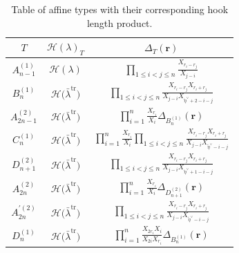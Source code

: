 \documentclass[pdftex]{sigma}
\numberwithin{equation}{section}
\def\cch{\mathcal H}
\begin{document}
\begin{table}[th]\centering\renewcommand{\arraystretch}{1.55}
\caption{Table of affine types with their corresponding hook length product.}\label{tableau2}
	\begin{tabular}{|c|c|c|}
		\hline
		$T$ & $\cch(\lambda)_T$ & $\Delta_T(\mathbf{r})$ \\
		\hline
		\rule{0pt}{17pt} $A^{(1)}_{n-1}$ & $\cch(\lambda)$ &
		$\displaystyle\prod_{1\leq i<j\leq n} \frac{X_{r_i-r_j}}{X_{j-i}}$\\
		\hline
		\rule{0pt}{17pt} $B^{(1)}_{n}$& $\cch\bigl(\bar{\lambda}^{\mathrm{tr}}\bigr)$ &$\displaystyle\prod_{1\leq i<j\leq n} \frac{X_{r_i-r_j}X_{r_i+r_j}}{X_{j-i}X_{\tilde{\eta}^{\vee}+2-i-j}}$ \\
		\hline
		\rule{0pt}{17pt}$A^{(2)}_{2n-1}$ & $\cch\bigl(\bar{\lambda}^{\mathrm{tr}}\bigr)$ &$\displaystyle \prod_{i=1}^{n}\frac{X_{r_i}}{X_i}\Delta_{B_n^{(1)}}(\mathbf{r})$\\
		\hline
		\rule{0pt}{17pt}$C^{(1)}_{n}$& $\cch\bigl(\bar{\lambda}^{\mathrm{tr}}\bigr)$ &$\displaystyle \prod_{i=1}^{n}\frac{X_{r_i}}{X_i}\displaystyle\prod_{1\leq i<j\leq n} \frac{X_{r_i-r_j}X_{r_i+r_j}}{X_{j-i}X_{\tilde{\eta}^{\vee}-i-j}}$\\
		\hline
		\rule{0pt}{17pt}$D^{(2)}_{n+1}$& $\cch\bigl(\bar{\lambda}^{\mathrm{tr}}\bigr)$ &$\displaystyle\prod_{1\leq i<j\leq n} \frac{X_{r_i-r_j}X_{r_i+r_j}}{X_{j-i}X_{\tilde{\eta}^{\vee}+1-i-j}}$\\
		\hline
		\rule{0pt}{17pt}$A^{(2)}_{2n}$& $\cch\bigl(\bar{\lambda}^{\mathrm{tr}}\bigr)$ & $\displaystyle \prod_{i=1}^{n}\frac{X_{r_i}}{X_i}\Delta_{D_{n+1}^{(2)}}(\mathbf{r})$\\
		\hline
		\rule{0pt}{17pt}$A^{\prime (2)}_{2n}$& $\cch\bigl(\bar{\lambda}^{\mathrm{tr}}\bigr)$ &$\displaystyle\prod_{1\leq i<j\leq n} \frac{X_{r_i-r_j}X_{r_i+r_j}}{X_{j-i}X_{\tilde{\eta}^{\vee}-i-j}}$ \\
		\hline
		
		\rule{0pt}{15pt}$D^{(1)}_{n}$& $\displaystyle \cch\bigl(\bar{\lambda}^{\mathrm{tr}}\bigr)$ & $\displaystyle \prod_{i=1}^{n}\frac{X_{2r_i}X_i}{X_{2i}X_{r_i} }\Delta_{B_n^{(1)}}(\mathbf{r})$\\
		\hline
	\end{tabular}
\end{table}
\end{document}

